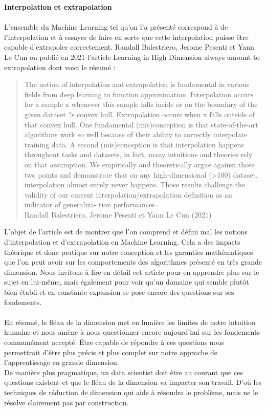\textbf{Interpolation et extrapolation}
\\
\\
L’ensemble du Machine Learning tel qu’on l’a présenté correspond à de l’interpolation et à essayer de faire en sorte que cette interpolation puisse être capable d’extrapoler correctement. Randall Balestriero, Jerome Pesenti et Yann Le Cun on publié en 2021 l’article Learning in High Dimension always amount to extrapolation dont voici le résumé :
\begin{quotation}
    The notion of interpolation and extrapolation is fundamental in various fields from deep learning to function approximation. Interpolation occurs for a sample x whenever this sample falls inside or on the boundary of the given dataset ?s convex hull. Extrapolation occurs when x falls outside of that convex hull. One fundamental (mis)conception is that state-of-the-art algorithms work so well because of their ability to correctly interpolate training data. A second (mis)conception is that interpolation happens throughout tasks and datasets, in fact, many intuitions and theories rely on that assumption. We empirically and theoretically argue against those two points and demonstrate that on any high-dimensional (>100) dataset, interpolation almost surely never happens. Those results challenge the validity of our current interpolation/extrapolation definition as an indicator of generaliza- tion performances.
    \\  
    Randall Balestriero, Jerome Pesenti et Yann Le Cun (2021)
\end{quotation}
L’objet de l’article est de montrer que l’on comprend et défini mal les notions d’interpolation et d’extrapolation en Machine Learning. Cela a des impacts théorique et donc pratique sur notre conception et les garanties mathématiques que l’on peut avoir sur les comportements des algorithmes présenté en très grande dimension. Nous invitons à lire en détail cet article pour en apprendre plus sur le sujet en lui-même, mais également pour voir qu’un domaine qui semble plutôt bien établi et en constante expansion se pose encore des questions sur ses fondements.
\\
\\
En résumé, le fléau de la dimension met en lumière les limites de notre intuition humaine et nous amène à nous questionner encore aujourd’hui sur les fondements communément accepté. Être capable de répondre à ces questions nous permettrait d’être plus précis et plus complet sur notre approche de l’apprentissage en grande dimension.
\\
De manière plus pragmatique, un data scientist doit être au courant que ces questions existent et que le fléau de la dimension va impacter son travail. D’où les techniques de réduction de dimension qui aide à résoudre le problème, mais ne le résolve clairement pas par construction.


